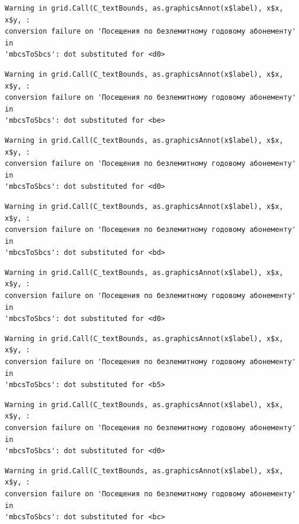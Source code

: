 \documentclass[
  letterpaper,
  DIV=11,
  numbers=noendperiod]{scrartcl}
\begin{document}
\begin{verbatim}
Warning in grid.Call(C_textBounds, as.graphicsAnnot(x$label), x$x, x$y, :
conversion failure on 'Посещения по безлемитному годовому абонементу' in
'mbcsToSbcs': dot substituted for <d0>
\end{verbatim}

\begin{verbatim}
Warning in grid.Call(C_textBounds, as.graphicsAnnot(x$label), x$x, x$y, :
conversion failure on 'Посещения по безлемитному годовому абонементу' in
'mbcsToSbcs': dot substituted for <be>
\end{verbatim}

\begin{verbatim}
Warning in grid.Call(C_textBounds, as.graphicsAnnot(x$label), x$x, x$y, :
conversion failure on 'Посещения по безлемитному годовому абонементу' in
'mbcsToSbcs': dot substituted for <d0>
\end{verbatim}

\begin{verbatim}
Warning in grid.Call(C_textBounds, as.graphicsAnnot(x$label), x$x, x$y, :
conversion failure on 'Посещения по безлемитному годовому абонементу' in
'mbcsToSbcs': dot substituted for <bd>
\end{verbatim}

\begin{verbatim}
Warning in grid.Call(C_textBounds, as.graphicsAnnot(x$label), x$x, x$y, :
conversion failure on 'Посещения по безлемитному годовому абонементу' in
'mbcsToSbcs': dot substituted for <d0>
\end{verbatim}

\begin{verbatim}
Warning in grid.Call(C_textBounds, as.graphicsAnnot(x$label), x$x, x$y, :
conversion failure on 'Посещения по безлемитному годовому абонементу' in
'mbcsToSbcs': dot substituted for <b5>
\end{verbatim}

\begin{verbatim}
Warning in grid.Call(C_textBounds, as.graphicsAnnot(x$label), x$x, x$y, :
conversion failure on 'Посещения по безлемитному годовому абонементу' in
'mbcsToSbcs': dot substituted for <d0>
\end{verbatim}

\begin{verbatim}
Warning in grid.Call(C_textBounds, as.graphicsAnnot(x$label), x$x, x$y, :
conversion failure on 'Посещения по безлемитному годовому абонементу' in
'mbcsToSbcs': dot substituted for <bc>
\end{verbatim}
\end{document}
